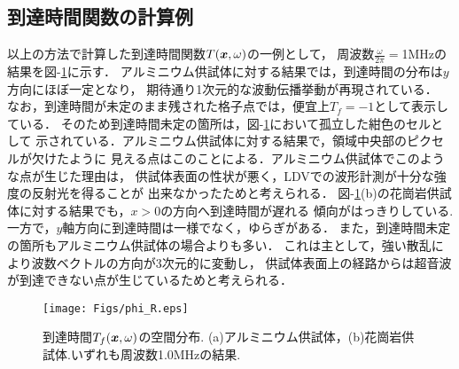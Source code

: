 \subsection{到達時間関数の計算例}
以上の方法で計算した到達時間関数$T(\mbox{\boldmath{$x$}},\omega)$の一例として，
周波数$\frac{\omega}{2\pi}=$1MHzの結果を図-\ref{fig:fig12}に示す． 
アルミニウム供試体に対する結果では，到達時間の分布は$y$方向にほぼ一定となり，
期待通り1次元的な波動伝播挙動が再現されている．
なお，到達時間が未定のまま残された格子点では，便宜上$T_f=-1$として表示している．
そのため到達時間未定の箇所は，図-\ref{fig:fig12}において孤立した紺色のセルとして
示されている．アルミニウム供試体に対する結果で，領域中央部のピクセルが欠けたように
見える点はこのことによる．アルミニウム供試体でこのような点が生じた理由は，
供試体表面の性状が悪く，LDVでの波形計測が十分な強度の反射光を得ることが
出来なかったためと考えられる．
図-\ref{fig:fig12}(b)の花崗岩供試体に対する結果でも，$x>0$の方向へ到達時間が遅れる
傾向がはっきりしている.一方で，$y$軸方向に到達時間は一様でなく，ゆらぎがある．
また，到達時間未定の箇所もアルミニウム供試体の場合よりも多い．
これは主として，強い散乱により波数ベクトルの方向が3次元的に変動し，
供試体表面上の経路からは超音波が到達できない点が生じているためと考えられる．
\begin{figure}
\begin{center}
	\texttt{[image: Figs/phi\_R.eps]}
	\caption{到達時間$T_f(\mbox{\boldmath{$x$}},\omega)$の空間分布. 
	(a)アルミニウム供試体，(b)花崗岩供試体.いずれも周波数1.0MHzの結果.}
	\label{fig:fig12}
\end{center}
\end{figure}
